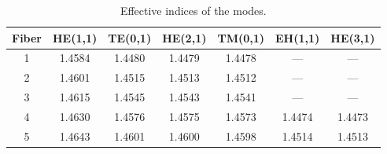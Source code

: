 \begin{table}[!t]
\caption[]{Effective indices of the modes.}
\label{tab:fiberneff}
\centering
\begin{tabular}{ccccccc}
Fiber & HE(1,1) & TE(0,1) & HE(2,1) & TM(0,1) & EH(1,1) & HE(3,1) \\
\hline
1 & 1.4584 & 1.4480 & 1.4479 & 1.4478 & --- & --- \\
2 & 1.4601 & 1.4515 & 1.4513 & 1.4512 & --- & --- \\
3 & 1.4615 & 1.4545 & 1.4543 & 1.4541 & --- & --- \\
4 & 1.4630 & 1.4576 & 1.4575 & 1.4573 & 1.4474 & 1.4473 \\
5 & 1.4643 & 1.4601 & 1.4600 & 1.4598 & 1.4514 & 1.4513 \\
\hline
\end{tabular}
\end{table}
